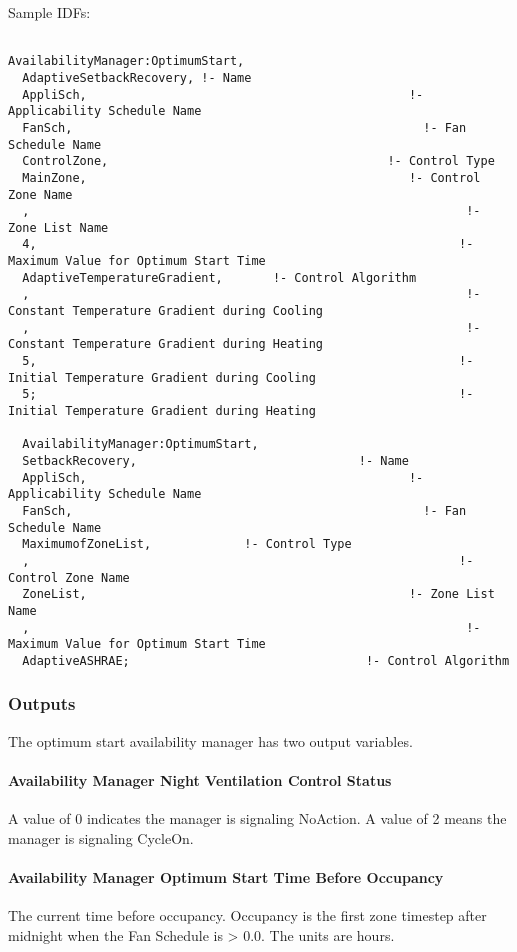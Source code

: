 Sample IDFs:

\begin{lstlisting}

AvailabilityManager:OptimumStart,
  AdaptiveSetbackRecovery, !- Name
  AppliSch,                                             !- Applicability Schedule Name
  FanSch,                                                 !- Fan Schedule Name
  ControlZone,                                       !- Control Type
  MainZone,                                             !- Control Zone Name
  ,                                                             !- Zone List Name
  4,                                                           !- Maximum Value for Optimum Start Time
  AdaptiveTemperatureGradient,       !- Control Algorithm
  ,                                                             !- Constant Temperature Gradient during Cooling
  ,                                                             !- Constant Temperature Gradient during Heating
  5,                                                           !- Initial Temperature Gradient during Cooling
  5;                                                           !- Initial Temperature Gradient during Heating

  AvailabilityManager:OptimumStart,
  SetbackRecovery,                               !- Name
  AppliSch,                                             !- Applicability Schedule Name
  FanSch,                                                 !- Fan Schedule Name
  MaximumofZoneList,             !- Control Type
  ,                                                            !- Control Zone Name
  ZoneList,                                             !- Zone List Name
  ,                                                             !- Maximum Value for Optimum Start Time
  AdaptiveASHRAE;                                 !- Control Algorithm
\end{lstlisting}

\subsubsection{Outputs}\label{outputs-10-007}

The optimum start availability manager has two output variables.

\paragraph{Availability Manager Night Ventilation Control Status}\label{availability-manager-night-ventilation-control-status-1}

A value of 0 indicates the manager is signaling NoAction. A value of 2 means the manager is signaling CycleOn.

\paragraph{Availability Manager Optimum Start Time Before Occupancy}\label{availability-manager-optimum-start-time-before-occupancy}

The current time before occupancy. Occupancy is the first zone timestep after midnight when the Fan Schedule is \textgreater{} 0.0. The units are hours.
